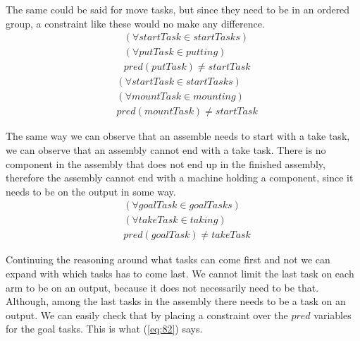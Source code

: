     The same could be said for move tasks, but since they need to be in an ordered group, a constraint like these would no make any difference.
  \begin{equation}\label{eq:79}
  \begin{aligned}
  &(\forall startTask \in startTasks)\\
  &(\forall putTask \in putting)\\
  &pred(putTask) \neq startTask
  \end{aligned}
  \end{equation}
  \begin{equation}\label{eq:80}
   \begin{aligned}
   &(\forall startTask \in startTasks)\\
   &(\forall mountTask \in mounting)\\
   &pred(mountTask) \neq startTask 
   \end{aligned}
  \end{equation}

   \noindent The same way we can observe that an assemble needs to start with a take task, we can observe that an assembly cannot end with a take task. There is no component in the assembly that does not end up in the finished assembly, therefore the assembly cannot end with a machine holding a component, since it needs to be on the output in some way.
  \begin{equation}\label{eq:81}
  \begin{aligned}
  &(\forall goalTask \in goalTasks) \\
  &(\forall takeTask \in taking) \\
  &pred(goalTask) \neq takeTask
  \end{aligned}
  \end{equation}
 
  \noindent Continuing the reasoning around what tasks can come first and not we can expand with which tasks has to come last. We cannot limit the last task on each arm to be on an output, because it does not necessarily need to be that. Although, among the last tasks in the assembly there needs to be a task on an output. We can easily check that by placing a constraint over the $pred$ variables for the goal tasks. This is what (\ref{eq:82}) says.
   
